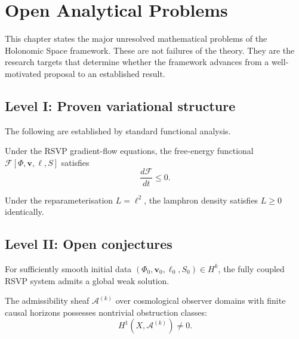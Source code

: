
\chapter{Open Analytical Problems}
\label{ch:open-problems}

This chapter states the major unresolved mathematical problems
of the Holonomic Space framework.
These are not failures of the theory.
They are the research targets that determine whether the framework
advances from a well-motivated proposal to an established result.

\section{Level I: Proven variational structure}

The following are established by standard functional analysis.

\begin{theorem} \statusproven{}
  Under the RSVP gradient-flow equations, the free-energy
  functional $\mathcal{F}[\Phi, \mathbf{v}, \ell, S]$
  satisfies
  \[
    \frac{d\mathcal{F}}{dt} \leq 0.
  \]
\end{theorem}

\begin{theorem} \statusproven{}
  Under the reparameterisation $L = \ell^2$, the lamphron
  density satisfies $L \geq 0$ identically.
\end{theorem}

\section{Level II: Open conjectures}

\begin{conjecture} \statusconjectured{}
  For sufficiently smooth initial data
  $(\Phi_0, \mathbf{v}_0, \ell_0, S_0) \in H^k$,
  the fully coupled RSVP system admits a global weak solution.
\end{conjecture}

\begin{conjecture} \statusconjectured{}
  The admissibility sheaf $\mathcal{A}^{(k)}$ over
  cosmological observer domains with finite causal horizons
  possesses nontrivial obstruction classes:
  \[
    H^1(X, \mathcal{A}^{(k)}) \neq 0.
  \]
\end{conjecture}

